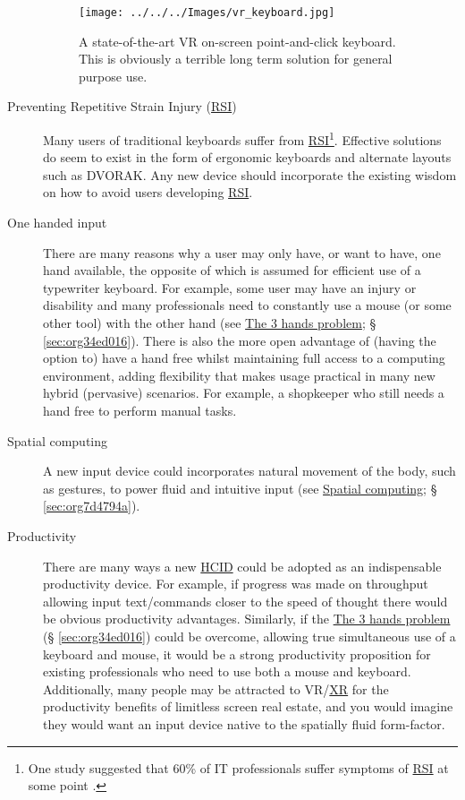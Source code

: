 \documentclass[logo,bsc,singlespacing,parskip]{infthesis}
\begin{document}
\begin{description}
\begin{figure}[h]
\centering
\texttt{[image: ../../../Images/vr\_keyboard.jpg]}
\caption[VR point-and-click on-screen keybaord]{\label{fig:virtual_keyboard}A state-of-the-art VR on-screen point-and-click keyboard. This is obviously a terrible long term solution for general purpose use.}
\end{figure}
\item[{Preventing Repetitive Strain Injury (\hyperref[orgafdb7af]{RSI})}] Many users of traditional keyboards suffer from \hyperref[orgafdb7af]{RSI}\footnote{One study suggested that 60\% of IT professionals suffer symptoms of \hyperref[orgafdb7af]{RSI} at some point \autocite{namayandegiEVALUATIONMETHODWHICH2015}.}.
Effective solutions do seem to exist in the form of ergonomic keyboards and alternate layouts such as DVORAK.
Any new device should incorporate the existing wisdom on how to avoid users developing \hyperref[orgafdb7af]{RSI}.

\item[{One handed input}] There are many reasons why a user may only have, or want to have, one hand available, the opposite of which is assumed for efficient use of a typewriter keyboard.
For example, some user may have an injury or disability and many professionals need to constantly use a mouse (or some other tool) with the other hand (see \hyperref[sec:org34ed016]{The 3 hands problem}; § \ref{sec:org34ed016}).
There is also the more open advantage of (having the option to) have a hand free whilst maintaining full access to a computing environment, adding flexibility that makes usage practical in many new hybrid (pervasive) scenarios.
For example, a shopkeeper who still needs a hand free to perform manual tasks.

\item[{Spatial computing}] A new input device could incorporates natural movement of the body, such as gestures, to power fluid and intuitive input (see \hyperref[sec:orgeda6b52]{Spatial computing}; § \ref{sec:org7d4794a}).

\item[{Productivity}] There are many ways a new \hyperref[org917851e]{HCID} could be adopted as an indispensable productivity device.
For example, if progress was made on throughput allowing input text/commands closer to the speed of thought there would be obvious productivity advantages.
Similarly, if the \hyperref[sec:org34ed016]{The 3 hands problem} (§ \ref{sec:org34ed016}) could be overcome, allowing true simultaneous use of a keyboard and mouse, it would be a strong productivity proposition for existing professionals who need to use both a mouse and keyboard.
Additionally, many people may be attracted to VR/\hyperref[org53dbe83]{XR} for the productivity benefits of limitless screen real estate, and you would imagine they would want an input device native to the spatially fluid form-factor.
\end{description}
\end{document}
